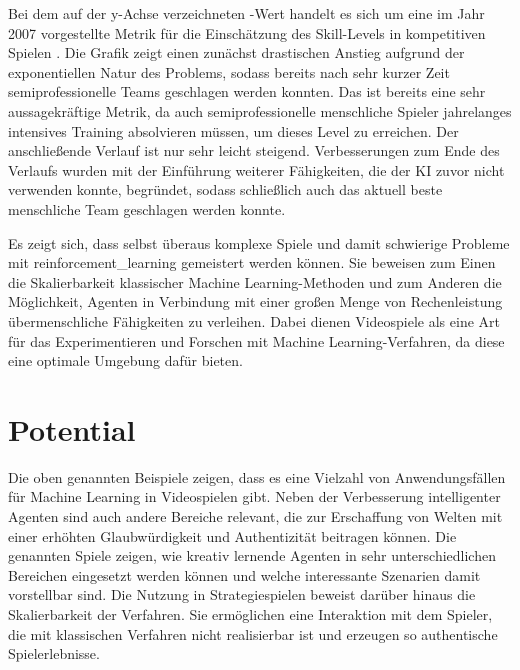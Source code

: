 Bei dem auf der y-Achse verzeichneten -Wert handelt es sich um eine im Jahr 2007 vorgestellte Metrik für die Einschätzung des Skill-Levels in kompetitiven Spielen \cite{NIPS2006_3079}. Die Grafik zeigt einen zunächst drastischen Anstieg aufgrund der exponentiellen Natur des Problems, sodass bereits nach sehr kurzer Zeit semiprofessionelle Teams geschlagen werden konnten. Das ist bereits eine sehr aussagekräftige Metrik, da auch semiprofessionelle menschliche Spieler jahrelanges intensives Training absolvieren müssen, um dieses Level zu erreichen. Der anschließende Verlauf ist nur sehr leicht steigend. Verbesserungen zum Ende des Verlaufs wurden mit der Einführung weiterer Fähigkeiten, die der KI zuvor nicht verwenden konnte, begründet, sodass schließlich auch das aktuell beste menschliche Team geschlagen werden konnte.

Es zeigt sich, dass selbst überaus komplexe Spiele und damit schwierige Probleme mit \ac{reinforcement_learning} gemeistert werden können. Sie beweisen zum Einen die Skalierbarkeit klassischer Machine Learning-Methoden und zum Anderen die Möglichkeit, Agenten in Verbindung mit einer großen Menge von Rechenleistung übermenschliche Fähigkeiten zu verleihen. Dabei dienen Videospiele als eine Art  für das Experimentieren und Forschen mit Machine Learning-Verfahren, da diese eine optimale Umgebung dafür bieten.










\section{Potential}
Die oben genannten Beispiele zeigen, dass es eine Vielzahl von Anwendungsfällen für Machine Learning in Videospielen gibt. Neben der Verbesserung intelligenter Agenten sind auch andere Bereiche relevant, die zur Erschaffung von Welten mit einer erhöhten Glaubwürdigkeit und Authentizität beitragen können. Die genannten Spiele zeigen, wie kreativ lernende Agenten in sehr unterschiedlichen Bereichen eingesetzt werden können und welche interessante Szenarien damit vorstellbar sind. Die Nutzung in Strategiespielen beweist darüber hinaus die Skalierbarkeit der Verfahren. Sie ermöglichen eine Interaktion mit dem Spieler, die mit klassischen Verfahren nicht realisierbar ist und erzeugen so authentische Spielerlebnisse.

